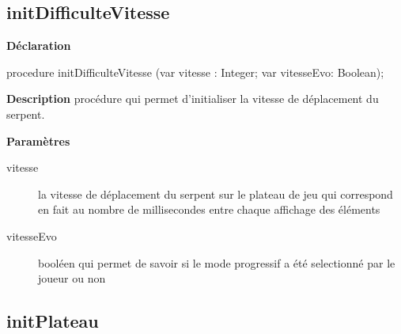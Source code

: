 \documentclass{report}
\newif\ifpdf
\begin{document}
\subsection*{initDifficulteVitesse}
\fi
\label{Initialisation-initDifficulteVitesse}
\begin{list}{}{
\setlength{\itemindent}{0cm}
\setlength{\listparindent}{0cm}
\setlength{\leftmargin}{\evensidemargin}
\addtolength{\leftmargin}{\tmplength}
\settowidth{\labelsep}{X}
\addtolength{\leftmargin}{\labelsep}
\setlength{\labelwidth}{\tmplength}
}
\item[\textbf{Déclaration}\hfill]
\ifpdf
\begin{flushleft}
\fi
\begin{ttfamily}
procedure initDifficulteVitesse (var vitesse : Integer; var vitesseEvo: Boolean);\end{ttfamily}

\ifpdf
\end{flushleft}
\fi

\par
\item[\textbf{Description}]
procédure qui permet d'initialiser la vitesse de déplacement du serpent.  \par
\item[\textbf{Paramètres}]
\begin{description}
\item[vitesse] la vitesse de déplacement du serpent sur le plateau de jeu qui correspond en fait au nombre de millisecondes entre chaque affichage des éléments
\item[vitesseEvo] booléen qui permet de savoir si le mode progressif a été selectionné par le joueur ou non
\end{description}


\end{list}
\ifpdf
\subsection*{\large{\textbf{initPlateau}}\normalsize\hspace{1ex}\hrulefill}
\else
\end{document}
